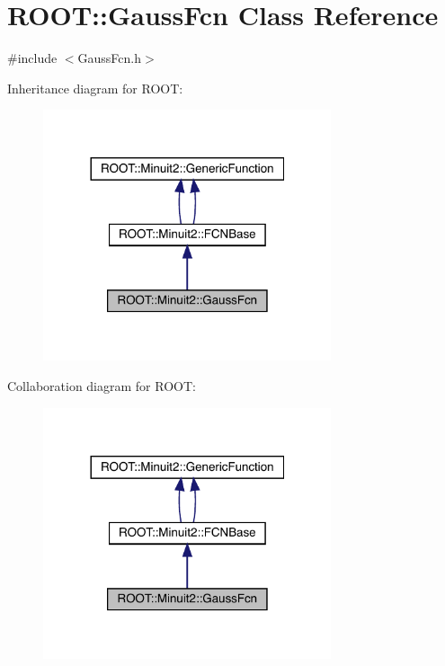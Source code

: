 \hypertarget{classROOT_1_1Minuit2_1_1GaussFcn}{}\section{R\+O\+OT\+:\+:Gauss\+Fcn Class Reference}
\label{classROOT_1_1Minuit2_1_1GaussFcn}


{\ttfamily \#include $<$Gauss\+Fcn.\+h$>$}



Inheritance diagram for R\+O\+OT\+:\nopagebreak
\begin{figure}[H]
\begin{center}
\leavevmode
\includegraphics[width=240pt]{dc/d41/classROOT_1_1Minuit2_1_1GaussFcn__inherit__graph}
\end{center}
\end{figure}


Collaboration diagram for R\+O\+OT\+:\nopagebreak
\begin{figure}[H]
\begin{center}
\leavevmode
\includegraphics[width=240pt]{d3/d3f/classROOT_1_1Minuit2_1_1GaussFcn__coll__graph}
\end{center}
\end{figure}

